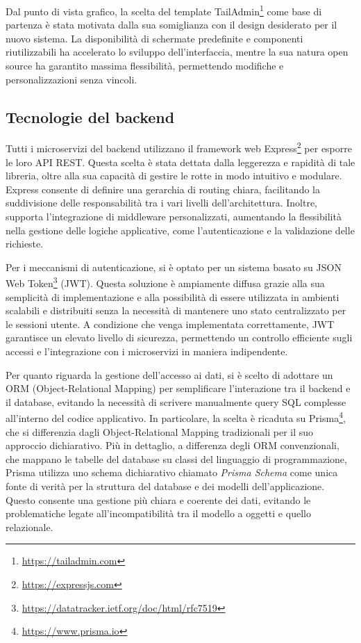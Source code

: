 Dal punto di vista grafico, la scelta del template TailAdmin\footnote{\url{https://tailadmin.com}} come base di partenza è stata motivata dalla sua somiglianza con il design desiderato per il nuovo sistema. La disponibilità di schermate predefinite e componenti riutilizzabili ha accelerato lo sviluppo dell’interfaccia, mentre la sua natura open source ha garantito massima flessibilità, permettendo modifiche e personalizzazioni senza vincoli.

\subsection{Tecnologie del backend}
Tutti i microservizi del backend utilizzano il framework web Express\footnote{\url{https://expressjs.com}} per esporre le loro API REST. Questa scelta è stata dettata dalla leggerezza e rapidità di tale libreria, oltre alla sua capacità di gestire le rotte in modo intuitivo e modulare. Express consente di definire una gerarchia di routing chiara, facilitando la suddivisione delle responsabilità tra i vari livelli dell'architettura. Inoltre, supporta l'integrazione di middleware personalizzati, aumentando la flessibilità nella gestione delle logiche applicative, come l'autenticazione e la validazione delle richieste.

Per i meccanismi di autenticazione, si è optato per un sistema basato su JSON Web Token\footnote{\url{https://datatracker.ietf.org/doc/html/rfc7519}} (JWT). Questa soluzione è ampiamente diffusa grazie alla sua semplicità di implementazione e alla possibilità di essere utilizzata in ambienti scalabili e distribuiti senza la necessità di mantenere uno stato centralizzato per le sessioni utente. A condizione che venga implementata correttamente, JWT garantisce un elevato livello di sicurezza, permettendo un controllo efficiente sugli accessi e l'integrazione con i microservizi in maniera indipendente.

Per quanto riguarda la gestione dell’accesso ai dati, si è scelto di adottare un ORM (Object-Relational Mapping) per semplificare l’interazione tra il backend e il database, evitando la necessità di scrivere manualmente query SQL complesse all’interno del codice applicativo. In particolare, la scelta è ricaduta su Prisma\footnote{\url{https://www.prisma.io}}, che si differenzia dagli Object-Relational Mapping tradizionali per il suo approccio dichiarativo. Più in dettaglio, a differenza degli ORM convenzionali, che mappano le tabelle del database su classi del linguaggio di programmazione, Prisma utilizza uno schema dichiarativo chiamato \textit{Prisma Schema} come unica fonte di verità per la struttura del database e dei modelli dell’applicazione. Questo consente una gestione più chiara e coerente dei dati, evitando le problematiche legate all'incompatibilità tra il modello a oggetti e quello relazionale.

